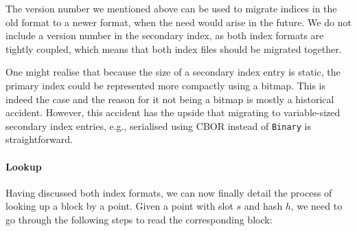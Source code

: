 The version number we mentioned above can be used to migrate indices in the old
format to a newer format, when the need would arise in the future. We do not
include a version number in the secondary index, as both index formats are
tightly coupled, which means that both index files should be migrated together.

One might realise that because the size of a secondary index entry is static,
the primary index could be represented more compactly using a bitmap. This is
indeed the case and the reason for it not being a bitmap is mostly a historical
accident. However, this accident has the upside that migrating to variable-sized
secondary index entries, e.g., serialised using CBOR instead of
\lstinline!Binary! is straightforward.

\paragraph{Lookup}

Having discussed both index formats, we can now finally detail the process of
looking up a block by a point. Given a point with slot $s$ and hash $h$, we need
to go through the following steps to read the corresponding block:

